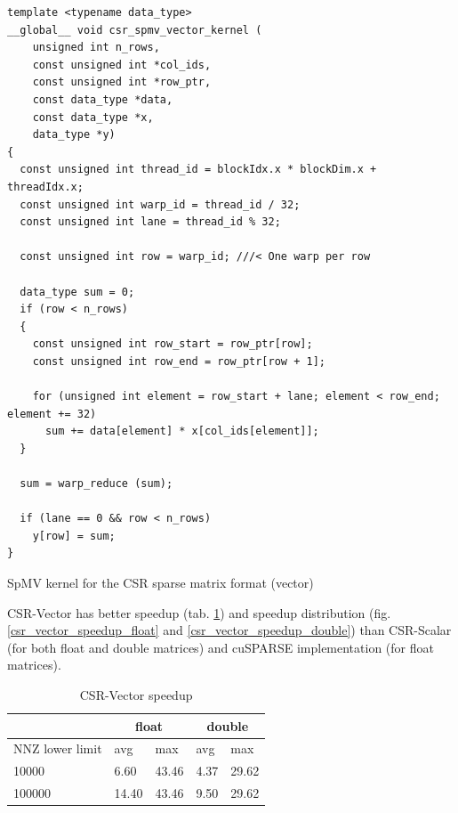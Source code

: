 \documentclass{article}
\begin{document}
\begin{listing}[H]
\begin{verbatim}
template <typename data_type>
__global__ void csr_spmv_vector_kernel (
    unsigned int n_rows,
    const unsigned int *col_ids,
    const unsigned int *row_ptr,
    const data_type *data,
    const data_type *x,
    data_type *y)
{
  const unsigned int thread_id = blockIdx.x * blockDim.x + threadIdx.x;
  const unsigned int warp_id = thread_id / 32;
  const unsigned int lane = thread_id % 32;

  const unsigned int row = warp_id; ///< One warp per row

  data_type sum = 0;
  if (row < n_rows)
  {
    const unsigned int row_start = row_ptr[row];
    const unsigned int row_end = row_ptr[row + 1];

    for (unsigned int element = row_start + lane; element < row_end; element += 32)
      sum += data[element] * x[col_ids[element]];
  }

  sum = warp_reduce (sum);

  if (lane == 0 && row < n_rows)
    y[row] = sum;
}
\end{verbatim}
\caption{SpMV kernel for the CSR sparse matrix format (vector)}
\label{csr_vector}
\end{listing}

CSR-Vector has better speedup (tab. \ref{csr_vector_speedup_table}) and speedup distribution (fig. \ref{csr_vector_speedup_float} and \ref{csr_vector_speedup_double}) 
than CSR-Scalar (for both float and double matrices) and cuSPARSE implementation (for float matrices).

\begin{table}[H]
	\centering
	\begin{tabular}{ |p{2.6cm}||p{1cm}|p{1cm}|p{1cm}|p{1cm}|  }
	 \hline
		& \multicolumn{2}{|c|}{float} & \multicolumn{2}{|c|}{double}\\
	 \hline
	 NNZ lower limit & avg & max & avg & max  \\
	 \hline
	 10000  & 6.60  & 43.46 & 4.37 & 29.62 \\
	 100000 & 14.40 & 43.46 & 9.50 & 29.62 \\
	 \hline
	\end{tabular}
	\caption{CSR-Vector speedup}
  \label{csr_vector_speedup_table}
\end{table}
\end{document}
